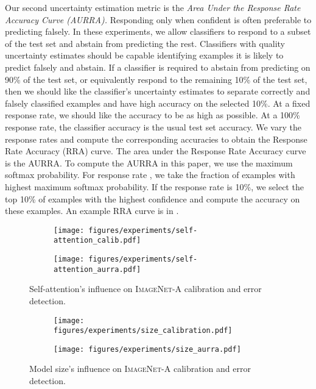 \documentclass[10pt,twocolumn,letterpaper]{article}
\begin{document}
Our second uncertainty estimation metric is the \textit{Area Under the Response Rate Accuracy Curve (AURRA).} Responding only when confident is often preferable to predicting falsely.
In these experiments, we allow classifiers to respond to a subset of the test set and abstain from predicting the rest. Classifiers with quality uncertainty estimates should be capable identifying examples it is likely to predict falsely and abstain. If a classifier is required to abstain from predicting on 90\% of the test set, or equivalently respond to the remaining 10\% of the test set, then we should like the classifier's uncertainty estimates to separate correctly and falsely classified examples and have high accuracy on the selected 10\%. At a fixed response rate, we should like the accuracy to be as high as possible. At a 100\% response rate, the classifier accuracy is the usual test set accuracy. We vary the response rates and compute the corresponding accuracies to obtain the Response Rate Accuracy (RRA) curve. The area under the Response Rate Accuracy curve is the AURRA. To compute the AURRA in this paper, we use the maximum softmax probability. For response rate , we take the  fraction of examples with highest maximum softmax probability. If the response rate is 10\%, we select the top 10\% of examples with the highest confidence and compute the accuracy on these examples. An example RRA curve is in  .



\begin{figure}[]
\begin{subfigure}{.48\textwidth}
    \centering
    \texttt{[image: figures/experiments/self-attention\_calib.pdf]}
\end{subfigure}
\begin{subfigure}{.48\textwidth}
    \centering
    \texttt{[image: figures/experiments/self-attention\_aurra.pdf]}
\end{subfigure}\caption{Self-attention's influence on \textsc{ImageNet-A}  calibration and error detection.}\end{figure}



\begin{figure}
\begin{subfigure}{.48\textwidth}
    \centering
    \texttt{[image: figures/experiments/size\_calibration.pdf]}
\end{subfigure}
\begin{subfigure}{.48\textwidth}
    \centering
    \texttt{[image: figures/experiments/size\_aurra.pdf]}
\end{subfigure}\caption{Model size's influence on \textsc{ImageNet-A}  calibration and error detection.}\end{figure}
\end{document}
